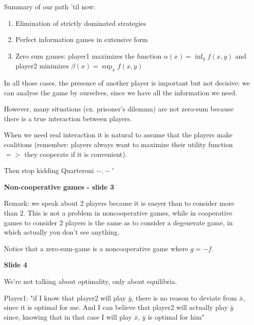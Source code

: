 
%


\noindent Summary of our path 'til now:
\begin{enumerate}
	\item Elimination of strictly dominated strategies
	\item Perfect information games in extensive form
	\item Zero sum games: player1 maximizes the function
		$\alpha(x) = \inf_y{f(x,y)}$ and player2 minimizes
		$\beta(x) = \sup_x{f(x,y)}$
\end{enumerate}
In all those cases, the presence of another player is important but not 
decisive: we can analyse the game by ourselves, since we have all the 
information we need.

\noindent However, many situations (ex. prisoner's dilemma) are not 
zero-sum because there is a true interaction between players.

\noindent When we need real interaction it is natural to assume that the 
players make coalitions (remember: players always want to maximize 
their utility function $=>$ they cooperate if it is convenient).

{\huge Then stop kidding Quarteroni $-.-'$ }

\bigskip
\noindent \textbf{Non-cooperative games - slide 3}

\noindent Remark: we speak about 2 players because it is easyer than 
to consider more than 2. This is not a problem in noncooperative games, 
while in cooperative games to consider 2 players is the same as to 
consider a degenerate game, in which actually you don't see anything.

\noindent Notice that a zero-sum-game is a noncooperative game where 
$g=-f$.

\bigskip
\noindent \textbf{Slide 4}

\noindent We're not talking about optimality, only about equilibria.

\noindent Player1: "if I know that player2 will play $\bar{y}$, there 
is no reason to deviate from $\bar{x}$, since it is optimal for me. 
And I can believe that player2 will actually play $\bar{y}$ since, 
knowing that in that case I will play $\bar{x}$, $\bar{y}$ is optimal 
for him"

